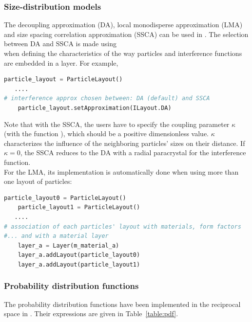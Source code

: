 \subsubsection{Size-distribution models}
The decoupling approximation (DA), local monodisperse approximation (LMA) and size spacing correlation approximation (SSCA) can be used in \BornAgain.
The selection between DA and SSCA is made using\\ 
 when defining the characteristics of the way particles and interference functions are embedded in a layer.  For example,
\begin{lstlisting}[language=python, style=eclipseboxed,numbers=none,nolol]
    particle_layout = ParticleLayout()
   ....
# interference approx chosen between: DA (default) and SSCA
    particle_layout.setApproximation(ILayout.DA)
\end{lstlisting}

Note that with the SSCA, the users have to specify the coupling parameter $\kappa$ (with the function ), which should be a positive dimensionless value. $\kappa$ characterizes the influence of the neighboring particles' sizes on their distance. If $\kappa=0$, the SSCA reduces to the DA with a radial paracrystal for the interference function.\\

For the LMA, its implementation is automatically done when using more than one layout of particles:
\begin{lstlisting}[language=python, style=eclipseboxed,numbers=none,nolol]
    particle_layout0 = ParticleLayout()
    particle_layout1 = ParticleLayout()
   ....
# association of each particles' layout with materials, form factors
#... and with a material layer
    layer_a = Layer(m_material_a)
    layer_a.addLayout(particle_layout0)
    layer_a.addLayout(particle_layout1)
\end{lstlisting}


\subsubsection{Probability distribution functions}\label{baftd}

The probability distribution functions have been implemented in the reciprocal space in \BornAgain. Their expressions are given in Table~\ref{table:pdf}.

